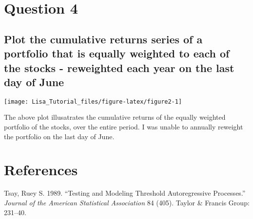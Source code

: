 \documentclass[11pt,preprint, authoryear]{elsarticle}
\let\origfigure\figure
\let\endorigfigure\endfigure
\renewenvironment{figure}[1][2] {
    \expandafter\origfigure\expandafter[H]
} {
    \endorigfigure
}
\numberwithin{equation}{section}
\numberwithin{figure}{section}
\numberwithin{table}{section}
\begin{document}
\section{\texorpdfstring{Question 4
\label{Q4}}{Question 4 }}\label{question-4}

\subsection{Plot the cumulative returns series of a portfolio that is
equally weighted to each of the stocks - reweighted each year on the
last day of
June}\label{plot-the-cumulative-returns-series-of-a-portfolio-that-is-equally-weighted-to-each-of-the-stocks---reweighted-each-year-on-the-last-day-of-june}

\begin{figure}[H]

{\centering \texttt{[image: Lisa\_Tutorial\_files/figure-latex/figure2-1]} 

}

\caption{Cumulative Plot \label{plot2}}\label{fig:figure2}
\end{figure}

The above plot illusatrates the cumulative returns of the equally
weighted portfolio of the stocks, over the entire period. I was unable
to annually reweight the portfolio on the last day of June.

\newpage

\section*{References}\label{references}

\hypertarget{refs}{}
\hypertarget{ref-tsay1989}{}
Tsay, Ruey S. 1989. ``Testing and Modeling Threshold Autoregressive
Processes.'' \emph{Journal of the American Statistical Association} 84
(405). Taylor \& Francis Group: 231--40.




\end{document}
